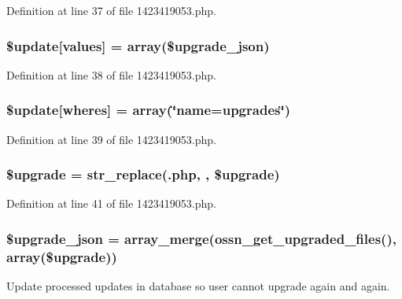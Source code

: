 Definition at line 37 of file 1423419053.\+php.

\subsubsection[{\texorpdfstring{\$update}{$update}}]{\setlength{\rightskip}{0pt plus 5cm}\${\bf update}\mbox{[}\textquotesingle{}values\textquotesingle{}\mbox{]} = array(\$upgrade\+\_\+json)}\hypertarget{1423419053_8php_ac82a75b4c6df37380ff77c88f041785e}{}\label{1423419053_8php_ac82a75b4c6df37380ff77c88f041785e}


Definition at line 38 of file 1423419053.\+php.

\subsubsection[{\texorpdfstring{\$update}{$update}}]{\setlength{\rightskip}{0pt plus 5cm}\${\bf update}\mbox{[}\textquotesingle{}wheres\textquotesingle{}\mbox{]} = array(\char`\"{}name=\textquotesingle{}upgrades\textquotesingle{}\char`\"{})}\hypertarget{1423419053_8php_aacde4479a904b32d0f24dea4e01f148c}{}\label{1423419053_8php_aacde4479a904b32d0f24dea4e01f148c}


Definition at line 39 of file 1423419053.\+php.

\subsubsection[{\texorpdfstring{\$upgrade}{$upgrade}}]{\setlength{\rightskip}{0pt plus 5cm}\$upgrade = str\+\_\+replace(\textquotesingle{}.php\textquotesingle{}, \textquotesingle{}\textquotesingle{}, \$upgrade)}\hypertarget{1423419053_8php_a9084097ce600d3cc7a79a20ecaea9906}{}\label{1423419053_8php_a9084097ce600d3cc7a79a20ecaea9906}


Definition at line 41 of file 1423419053.\+php.

\subsubsection[{\texorpdfstring{\$upgrade\+\_\+json}{$upgrade_json}}]{\setlength{\rightskip}{0pt plus 5cm}\$upgrade\+\_\+json = array\+\_\+merge({\bf ossn\+\_\+get\+\_\+upgraded\+\_\+files}(), array(\$upgrade))}\hypertarget{1423419053_8php_a512525d0f5eb608ac72ca7b85e5fbf65}{}\label{1423419053_8php_a512525d0f5eb608ac72ca7b85e5fbf65}
Update processed updates in database so user cannot upgrade again and again.

